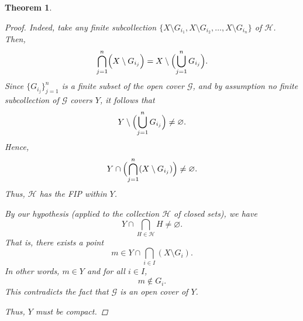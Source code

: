 \documentclass[12pt]{article}
\theoremstyle{bigskipthmstyle}
\theoremstyle{thmstyle}
\newtheorem{theorem}{Theorem}[section]
\theoremstyle{plainstyle}
\begin{document}
\begin{theorem}
\begin{proof}
Indeed, take any finite subcollection \(\{X\setminus G_{i_1}, X\setminus G_{i_2}, \dots, X\setminus G_{i_n}\}\) of \(\mathcal{H}\). Then,
\[
\bigcap_{j=1}^n \Bigl(X\setminus G_{i_j}\Bigr)
=
X\setminus \Bigl(\bigcup_{j=1}^n G_{i_j}\Bigr).
\]
Since \(\{G_{i_j}\}_{j=1}^n\) is a finite subset of the open cover \(\mathcal{G}\), and by assumption no finite subcollection of \(\mathcal{G}\) covers \(Y\), it follows that
\[
Y \setminus \Bigl(\bigcup_{j=1}^n G_{i_j}\Bigr) \neq \varnothing.
\]
Hence,
\[
Y \cap \Bigl(\bigcap_{j=1}^n (X\setminus G_{i_j})\Bigr) \neq \varnothing.
\]
Thus, \(\mathcal{H}\) has the FIP within \(Y\).

By our hypothesis (applied to the collection \(\mathcal{H}\) of closed sets), we have
\[
Y \cap \bigcap_{H\in \mathcal{H}} H \neq \varnothing.
\]
That is, there exists a point
\[
m \in Y \cap \bigcap_{i\in I} (X\setminus G_i).
\]
In other words, \(m\in Y\) and for all \(i\in I\),
\[
m \notin G_i.
\]
This contradicts the fact that \(\mathcal{G}\) is an open cover of \(Y\).

Thus, \(Y\) must be compact.


\renewcommand\qedsymbol{QED}
\end{proof}


\end{theorem}
\end{document}
